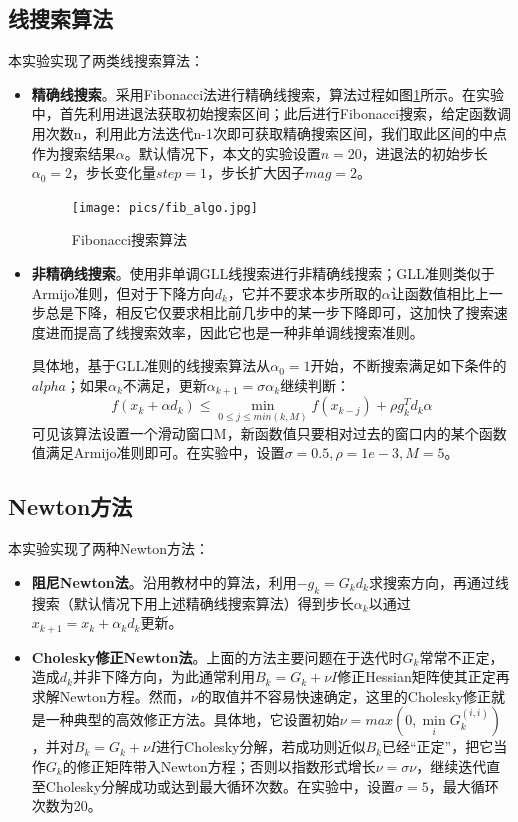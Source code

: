\documentclass{article}
\begin{document}
\subsection{线搜索算法}
本实验实现了两类线搜索算法：
\begin{itemize}
  \item \textbf{精确线搜索}。采用Fibonacci法进行精确线搜索，算法过程如图\ref{fig:fib_algo}所示。在实验中，首先利用进退法获取初始搜索区间；此后进行Fibonacci搜索，给定函数调用次数n，利用此方法迭代n-1次即可获取精确搜索区间，我们取此区间的中点作为搜索结果$\alpha$。默认情况下，本文的实验设置$n=20$，进退法的初始步长$\alpha_0=2$，步长变化量$step=1$，步长扩大因子$mag=2$。
  \begin{figure}[h]
    \centering
    \texttt{[image: pics/fib\_algo.jpg]}
    \caption{Fibonacci搜索算法}
    \label{fig:fib_algo}
  \end{figure}
  \item \textbf{非精确线搜索}。使用非单调GLL线搜索进行非精确线搜索；GLL准则类似于Armijo准则，但对于下降方向$d_k$，它并不要求本步所取的$\alpha$让函数值相比上一步总是下降，相反它仅要求相比前几步中的某一步下降即可，这加快了搜索速度进而提高了线搜索效率，因此它也是一种非单调线搜索准则。
  
  具体地，基于GLL准则的线搜索算法从$\alpha_0 = 1$开始，不断搜索满足如下条件的$alpha$；如果$\alpha_k$不满足，更新$\alpha_{k+1} = \sigma\alpha_k$继续判断：
  \[ f(x_k + \alpha d_k) \leq \min\limits_{0\leq j \leq min(k, M)} f(x_{k-j}) + \rho g_k^T d_k \alpha \]
  可见该算法设置一个滑动窗口M，新函数值只要相对过去的窗口内的某个函数值满足Armijo准则即可。在实验中，设置$\sigma=0.5, \rho=1e-3, M=5$。
\end{itemize}


\subsection{Newton方法}
本实验实现了两种Newton方法：
\begin{itemize}
  \item \textbf{阻尼Newton法}。沿用教材中的算法，利用$-g_k = G_k d_k$求搜索方向，再通过线搜索（默认情况下用上述精确线搜索算法）得到步长$\alpha_k$以通过$x_{k+1} = x_k + \alpha_k d_k$更新。
  \item \textbf{Cholesky修正Newton法}。上面的方法主要问题在于迭代时$G_k$常常不正定，造成$d_k$并非下降方向，为此通常利用$B_k = G_k + \nu I$修正Hessian矩阵使其正定再求解Newton方程。然而，$\nu$的取值并不容易快速确定，这里的Cholesky修正就是一种典型的高效修正方法。具体地，它设置初始$\nu = max(0, \min\limits_i G_k^{(i,i)})$，并对$B_k = G_k + \nu I$进行Cholesky分解，若成功则近似$B_k$已经“正定”，把它当作$G_k$的修正矩阵带入Newton方程；否则以指数形式增长$\nu = \sigma \nu$，继续迭代直至Cholesky分解成功或达到最大循环次数。在实验中，设置$\sigma=5$，最大循环次数为20。
\end{itemize}
\end{document}
